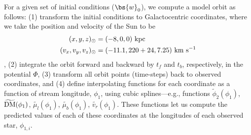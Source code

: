 \documentclass[letterpaper,12pt,preprint]{aastex}
\newcommand{\DM}{{\rm DM}}
\begin{document}
For a given set of initial conditions ($\bs{w}_0$), we compute a model orbit as follows: (1) transform the initial conditions to Galactocentric coordinates, where we take the position and velocity of the Sun to be 
\begin{align}
	(x,y,z)_\odot &= (-8,0,0)~{\rm kpc}\\
	(v_x,v_y,v_z)_\odot &= (-11.1, 220+24, 7.25)~{\rm km}~{\rm s}^{-1}
\end{align}
\citep{8kpref??, schonrich10, bovy12}, (2) integrate the orbit forward and backward by $t_f$ and $t_b$, respectively, in the potential $\Phi$, (3) transform all orbit points (time-steps) back to observed coordinates, and (4) define interpolating functions for each coordinate as a function of stream longitude, $\phi_1$, using cubic splines---e.g., functions $\widetilde{\phi}_{2}(\phi_1)$, $\widetilde{\DM}(\phi_1)$, $\widetilde{\mu_l}(\phi_1)$, $\widetilde{\mu_b}(\phi_1)$, $\widetilde{v_r}(\phi_1)$. These functions let us compute the predicted values of each of these coordinates at the longitudes of each observed star, $\phi_{1,i}$.
\end{document}
